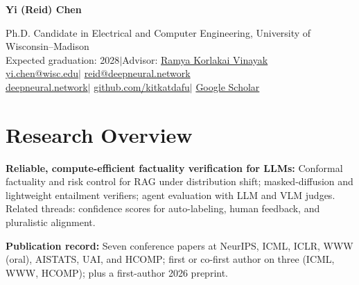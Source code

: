 \documentclass[11pt,letterpaper]{article}
\begin{document}
\thispagestyle{firstpage}
{\Huge\bfseries Yi (Reid) Chen}\par
\vspace{5pt}
Ph.D. Candidate in Electrical and Computer Engineering, University of Wisconsin--Madison\\
Expected graduation: 2028\enspace$\vert$\enspace Advisor: \href{https://ramyakv.github.io/}{Ramya Korlakai Vinayak}\\
\href{mailto:yi.chen@wisc.edu}{yi.chen@wisc.edu}\enspace$\vert$\enspace
\href{mailto:reid@deepneural.network}{reid@deepneural.network}\\
\href{https://www.deepneural.network/}{deepneural.network}\enspace$\vert$\enspace
\href{https://github.com/kitkatdafu}{github.com/kitkatdafu}\enspace$\vert$\enspace
\href{https://scholar.google.com/citations?user=QoO6pMEAAAAJ}{Google Scholar}

\section*{Research Overview}
\textbf{Reliable, compute-efficient factuality verification for LLMs:} Conformal factuality and risk control for RAG under distribution shift; masked-diffusion and lightweight entailment verifiers; agent evaluation with LLM and VLM judges. Related threads: confidence scores for auto-labeling, human feedback, and pluralistic alignment.\par
\textbf{Publication record:} Seven conference papers at NeurIPS, ICML, ICLR, WWW (oral), AISTATS, UAI, and HCOMP\@; first or co-first author on three (ICML, WWW, HCOMP); plus a first-author 2026 preprint.
\end{document}
